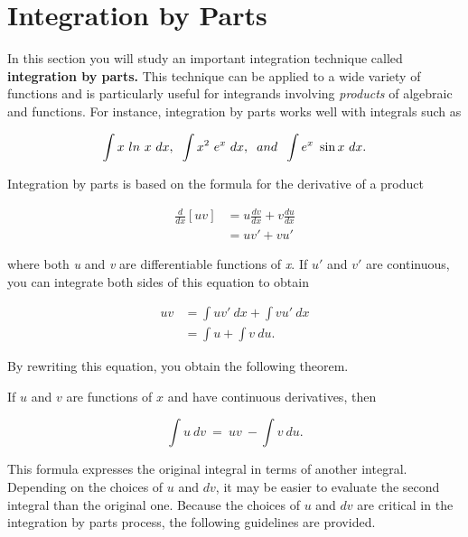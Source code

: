 \documentclass[oneside]{book}
\begin{document}
\section{\color{mypink}Integration by Parts}
\color{black} \rmfamily
In this section you will study an important integration technique called \textbf{integration by parts.} This technique can be applied to a wide variety of functions and is particularly useful for integrands involving \textit{products} of algebraic and  functions. For instance, integration by parts works well with integrals such as

$$ \int x\ ln\ x\ dx, \hspace{.2cm} \int x^2\ e^x\ dx, \hspace{.2cm} and \hspace{.2cm} \int e^x\ \sin x\ dx. $$

\noindent Integration by parts is based on the formula for the derivative of a product 

\begin{align*}
\frac{d}{dx} [uv] &= u \frac{dv}{dx} + v \frac{du}{dx}\\
 &= uv' + vu'
\end{align*}

\noindent where both \textit{u} and \textit{v} are differentiable functions of \textit{x}. If $u'$ and $v'$ are continuous, you can integrate both sides of this equation to obtain

\begin{align*}
uv &= \int uv' \ dx + \int vu' \ dx\\
&= \int u + \int v \ du.
\end{align*}

\noindent By rewriting this equation, you obtain the following theorem.

\begin{tcolorbox}[colback = white!5!white, 
				  colframe = myblue,
				  colbacktitle = white!5!white,
				  drop shadow southeast, 
				  enhanced,
				  sharp corners = all, 
title =\color{myblue}\textbf{THEOREM 8.1 \color{black} INTEGRATION BY PARTS}]
If $u$ and $v$ are functions of $x$ and have continuous derivatives, then

$$ \int u \ dv \ = \ uv \ - \int v \ du.$$
\end{tcolorbox}

\bigskip

This formula expresses the original integral in terms of another integral. Depending on the choices of $u$ and $dv$, it may be easier to evaluate the second integral than the original one. Because the choices of $u$ and $dv$ are critical in the integration by parts process, the following guidelines are provided. 
\end{document}

